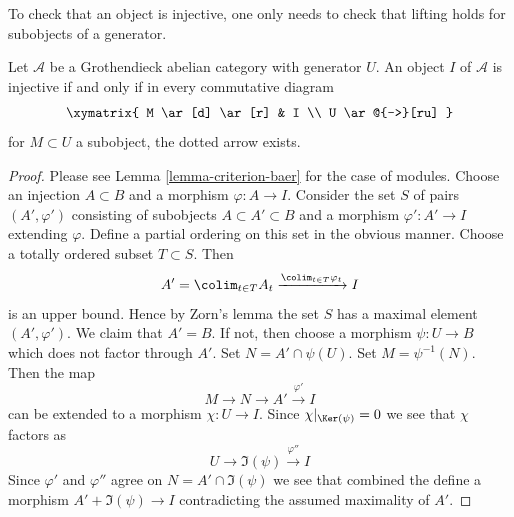 \begin{lemma}
\label{lemma-characterize-injective}
\begin{slogan}
To check that an object is injective, one only needs to check that lifting
holds for subobjects of a generator.
\end{slogan}
Let $\mathcal{A}$ be a Grothendieck abelian category with generator $U$.
An object $I$ of $\mathcal{A}$ is injective if and only if in every
commutative diagram
$$
\xymatrix{
M \ar[d] \ar[r] &  I \\
U \ar@{-->}[ru]
}
$$
for $M \subset U$ a subobject, the dotted arrow exists.
\end{lemma}

\begin{proof}
Please see Lemma \ref{lemma-criterion-baer} for the case of modules.
Choose an injection $A \subset B$ and a morphism $\varphi : A \to I$.
Consider the set $S$ of pairs $(A', \varphi')$ consisting of
subobjects $A \subset A' \subset B$ and a morphism $\varphi' : A' \to I$
extending $\varphi$. Define a partial ordering on this set in the obvious
manner. Choose a totally ordered subset $T \subset S$. Then
$$
A' = \colim_{t \in T} A_t \xrightarrow{\colim_{t \in T} \varphi_t} I
$$
is an upper bound. Hence by Zorn's lemma the set $S$ has a maximal element
$(A', \varphi')$. We claim that $A' = B$. If not, then choose a morphism
$\psi : U \to B$ which does not factor through $A'$. Set
$N = A' \cap \psi(U)$. Set $M = \psi^{-1}(N)$. Then the map
$$
M \to N \to A' \xrightarrow{\varphi'} I
$$
can be extended to a morphism $\chi : U \to I$. Since
$\chi|_{\Ker(\psi)} = 0$ we see that $\chi$ factors as
$$
U \to \Im(\psi) \xrightarrow{\varphi''} I
$$
Since $\varphi'$ and $\varphi''$ agree on $N = A' \cap \Im(\psi)$
we see that combined the define a morphism $A' + \Im(\psi) \to I$
contradicting the assumed maximality of $A'$.
\end{proof}

